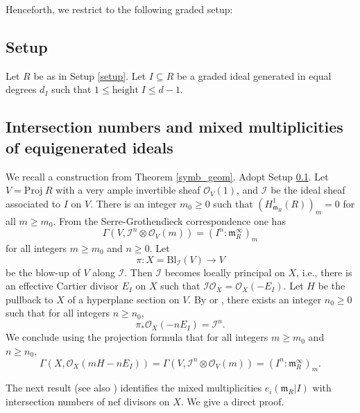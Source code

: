 \documentclass[12pt,a4paper]{amsart}
\theoremstyle{plain}
\theoremstyle{definition}
\numberwithin{equation}{theorem}
\begin{document}
Henceforth, we restrict to the following graded setup:

\subsection{Setup}\label{setup5} Let $R$ be as in Setup \ref{setup}. Let $I\subseteq R$ be a graded ideal generated in equal degrees $d_I$ such that $1\leq \mathrm{height}\;I\leq d-1$.

\subsection{Intersection numbers and mixed multiplicities of equigenerated ideals}

We recall a construction from Theorem \ref{symb_geom}. Adopt Setup \ref{setup5}. Let $V = \mathrm{Proj}\;R$ with a very ample invertible sheaf $\mathcal{O}_V(1)$, and $\mathcal{I}$ be the ideal sheaf associated to $I$ on $V$. There is an integer $m_0\geq 0$ such that ${\left(H^1_{\mathfrak{m}_R}(R)\right)}_m = 0$ for all $m\geq m_0$. From the Serre-Grothendieck correspondence one has $$\Gamma\left(V, \mathcal{I}^n\otimes \mathcal{O}_V(m)\right) = {\left(I^n : \mathfrak{m}_R^{\infty}\right)}_m$$ for all integers $m\geq m_0$ and $n\geq 0$. Let $$\pi \colon X = \mathrm{Bl}_{\mathcal{I}}(V) \longrightarrow V$$ be the blow-up of $V$ along $\mathcal{I}$. Then $\mathcal{I}$ becomes locally principal on $X$, i.e., there is an effective Cartier divisor $E_I$ on $X$ such that $\mathcal{I}\mathcal{O}_X = \mathcal{O}_{X}(-E_I)$. Let $H$ be the pullback to $X$ of a hyperplane section on $V$. By \cite[Lemma 3.3]{CEL01} or \cite[Lemma 5.4.24]{Laz04a}, there exists an integer $n_0\geq 0$ such that for all integers $n\geq n_0$, $$\pi_*\mathcal{O}_X(-nE_I) = \mathcal{I}^n.$$ We conclude using the projection formula that for all integers $m\geq m_0$ and $n\geq n_0$,
\begin{equation}\label{eq_imp_1}
\Gamma\left(X,\mathcal{O}_X(mH-nE_I)\right) = \Gamma\left(V, \mathcal{I}^n\otimes \mathcal{O}_V(m)\right) = {\left(I^n : \mathfrak{m}_R^{\infty}\right)}_m.
\end{equation}

The next result (see also \cite[Proposition 5.23]{DRT25}) identifies the mixed multiplicities $e_i\left(\mathfrak{m}_R \vert I\right)$ with intersection numbers of nef divisors on $X$. We give a direct proof.
\end{document}
